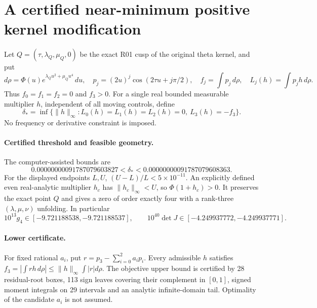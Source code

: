 \section{A certified near-minimum positive kernel modification}

Let $Q=(\tau,\lambda_Q,\mu_Q,0)$ be the exact R01 cusp of the original
theta kernel, and put
\[
 d\rho=\Phi(u)e^{\lambda_Qu^2+\mu_Qu^4}\,du,\quad
 p_j=(2u)^j\cos(2\tau u+j\pi/2),\quad
 f_j=\int p_j\,d\rho,\quad L_j(h)=\int p_jh\,d\rho.
\]
Thus $f_0=f_1=f_2=0$ and $f_3>0$. For a single real bounded measurable
multiplier $h$, independent of all moving controls, define
\[
 \delta_* =\inf\{\|h\|_\infty:
 L_0(h)=L_1(h)=L_2(h)=0,\ L_3(h)=-f_3\}.
\]
No frequency or derivative constraint is imposed.

\paragraph{Certified threshold and feasible geometry.}
The computer-assisted bounds are
\[
 \boxed{0.00000000091787079603827<\delta_*
             <0.00000000091787079608363.}
\]
For the displayed endpoints $L,U$, $(U-L)/L<5\times10^{-11}$.
An explicitly defined even real-analytic multiplier $h_c$ has
$\|h_c\|_\infty<U$, so $\Phi(1+h_c)>0$. It preserves the exact
point $Q$ and gives a zero of order exactly four with a rank-three
$(\lambda,\mu,\nu)$ unfolding. In particular
\[
10^{13}g_4\in[-9.721188538,-9.721188537],\qquad
10^{40}\det J\in[-4.249937772,-4.249937771].
\]

\paragraph{Lower certificate.}
For fixed rational $a_i$, put $r=p_3-\sum_{i=0}^2a_ip_i$.
Every admissible $h$ satisfies
$f_3=|\int rh\,d\rho|\le\|h\|_\infty\int|r|d\rho$.
The objective upper bound is certified by 28 residual-root boxes,
113 sign leaves covering their complement in $[0,1]$, signed
moment integrals on 29 intervals and an analytic infinite-domain
tail. Optimality of the candidate $a_i$ is not assumed.

